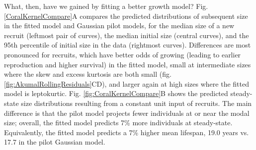 \documentclass[12pt]{article}
\begin{document}
What, then, have we gained by fitting a better growth model? Fig. \ref{CoralKernelCompare}A
compares the predicted distributions of subsequent size in the fitted model and Gaussian pilot models, for the median size of a new recruit 
(leftmost pair of curves), the median initial size (central curves), and the 95th percentile of initial size in the data (rightmost
curves). Differences are most pronounced for recruits, which have better odds of growing (leading to earlier reproduction and higher
survival) in the fitted model, small at intermediate sizes where the skew and excess kurtosis are both small (fig. \ref{fig:AkumalRollingResiduals}CD),
and larger again at high sizes where the fitted model is leptokurtic. Fig. \ref{fig:CoralKernelCompare}B shows the predicted steady-state size
distributions resulting from a constant unit input of recruits. The main difference is that the pilot model projects fewer individuals at
or near the modal size; overall, the fitted model predicts 7\% more individuals at steady-state. Equivalently, the fitted
model predicts a 7\% higher mean lifespan, 19.0 years vs. 17.7 in the pilot Gaussian model. 
\end{document}
